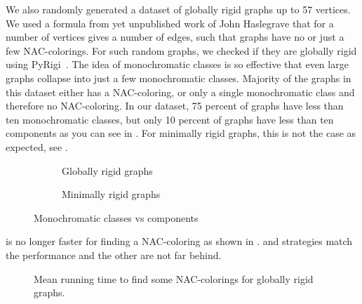We also randomly generated a dataset of globally rigid graphs
up to 57 vertices.
We used a formula from yet unpublished work of John Haslegrave
that for a number of vertices gives a number of edges,
such that graphs have no or just a few NAC-colorings.
For such random graphs, we checked if they are globally rigid using PyRigi~\cite{pyrigi}.
%
The idea of monochromatic classes is so effective
that even large graphs collapse into just a few monochromatic classes.
Majority of the graphs in this dataset either has a NAC-coloring,
or only a single monochromatic class and therefore no NAC-coloring.
In our dataset, 75 percent of graphs have less than ten	monochromatic classes,
but only 10 percent of graphs have less than ten \trcon{} components
as you can see in .
For minimally rigid graphs, this is not the case as expected, see
.
%
\begin{figure}[h!]
	\centering
	\begin{subfigure}{0.48\textwidth}
		\centering
		\scalebox{0.6}{}
		\caption[Monoch. classes vs tr. con. components for globally rigid]{%
			\centering Globally rigid graphs}%
		\label{fig:monochrom_vs_triangle_globally_rigid}
	\end{subfigure}
	\hfill
	\begin{subfigure}{0.48\textwidth}
		\centering
		\scalebox{0.6}{}
		\caption[Monoch. classes vs tr. con. components for minimally rigid]{%
			\centering Minimally rigid graphs}%
		\label{fig:monochrom_vs_triangle_minimally_rigid}
	\end{subfigure}
	\caption{Monochromatic classes vs \trcon{} components}%
	\label{fig:monochrom_vs_triangle}
\end{figure}

\NaiveCycles{} is no longer faster for finding a NAC-coloring
as shown in .
\None{} and \Neighbors{} strategies match the performance and
the other are not far behind.
%
\begin{figure}[thbp]
	\centering
	\scalebox{\BenchFigureScale}{}
	\caption[Mean runtime for globally rigid graphs (some)]{
		Mean running time to find some NAC-colorings for globally rigid graphs.}%
	\label{fig:graph_globally_rigid_first_runtime}
\end{figure}%

